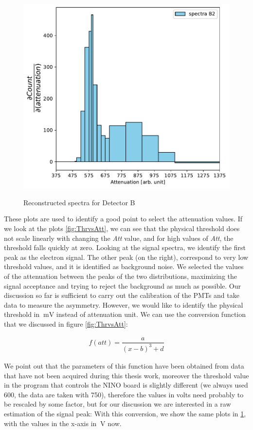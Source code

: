 \begin{figure}[!hbtp]
{\includegraphics[scale = 0.4]{Analysis/CalibrationPMT/B2.pdf}}
\caption{Reconstructed spectra for Detector B}
\label{fig:Spectra}
\end{figure}

These plots are used to identify a good point to select the attenuation values. If we look at the plots \ref{fig:ThrvsAtt}, we can see that the physical threshold does not scale linearly with changing the \textit{Att} value, and for high values of \textit{Att}, the threshold falls quickly at zero. Looking at the signal spectra, we identify the first peak as the electron signal. The other peak (on the right), correspond to very low threshold values, and it is identified as background noise. 
We selected the values of the attenuation between the peaks of the two distributions, maximizing the signal acceptance and trying to reject the background as much as possible.
Our discussion so far is sufficient to carry out the calibration of the PMTs and take data to measure the asymmetry. However, we would like to identify the physical threshold in $\SI{}{\milli \volt}$ instead of attenuation unit. We can use the conversion function that we discussed in figure \ref{fig:ThrvsAtt}:

\begin{align*}
f(att) = \dfrac{a}{(x - b)^{3} + d}
\end{align*} 

We point out that the parameters of this function have been obtained from data that have not been acquired during this thesis work, moreover the threshold value in the program that controls the NINO board is slightly different (we always used 600, the data are taken with 750), therefore the values in volts need probably to be rescaled by some factor, but for our discussion we are interested in a raw estimation of the signal peak:
With this conversion, we show the same plots in \ref{fig:Spectra}, with the values in the x-axis in $\SI{}{\volt}$ now.


